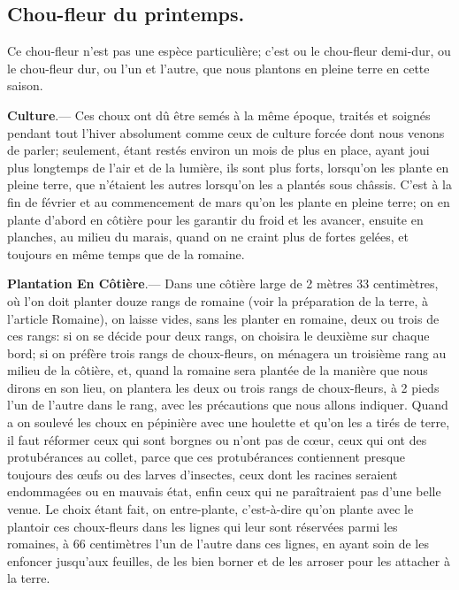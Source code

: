 \documentclass[10pt,a4paper]{book}
\begin{document}
\subsection{Chou-fleur du printemps.}

Ce chou-fleur n'est pas une espèce particulière; c'est ou le chou-fleur demi-dur, ou le chou-fleur dur, ou l'un et l'autre, que nous plantons en pleine terre en cette saison.

\textbf{Culture}.--- Ces choux ont dû être semés à la même époque, traités et soignés pendant tout l'hiver absolument comme ceux de culture forcée dont nous venons de parler; seulement, étant restés environ un mois de plus en place, ayant joui plus longtemps de l'air et de la lumière, ils sont plus forts, lorsqu'on les plante en pleine terre, que n'étaient les autres lorsqu'on les a plantés sous châssis. C'est à la fin de février et au commencement de mars qu'on les plante en pleine terre; on en plante d'abord en côtière pour les garantir du froid et les avancer, ensuite en planches, au milieu du marais, quand on ne craint plus de fortes gelées, et toujours en même temps que de la romaine.

\textbf{Plantation En Côtière}.--- Dans une côtière large de 2 mètres 33 centimètres, où l'on doit planter douze rangs de romaine (voir la préparation de la terre, à l'article Romaine), on laisse vides, sans les planter en romaine, deux ou trois de ces rangs: si on se décide pour deux rangs, on choisira le deuxième sur chaque bord; si on préfère trois rangs de choux-fleurs, on ménagera un troisième rang au milieu de la côtière, et, quand la romaine sera plantée de la manière que nous dirons en son lieu, on plantera les deux ou trois rangs de choux-fleurs, à 2 pieds l'un de l'autre dans le rang, avec les précautions que nous allons indiquer. Quand a on soulevé les choux en pépinière avec une houlette et qu'on les a tirés de terre, il faut réformer ceux qui sont borgnes ou n'ont pas de cœur, ceux qui ont des protubérances au collet, parce que ces protubérances contiennent presque toujours des œufs ou des larves d'insectes, ceux dont les racines seraient endommagées ou en mauvais état, enfin ceux qui ne paraîtraient pas d'une belle venue. Le choix étant fait, on entre-plante, c'est-à-dire qu'on plante avec le plantoir ces choux-fleurs dans les lignes qui leur sont réservées parmi les romaines, à 66 centimètres l'un de l'autre dans ces lignes, en ayant soin de les enfoncer jusqu'aux feuilles, de les bien borner et de les arroser pour les attacher à la terre.
\end{document}
